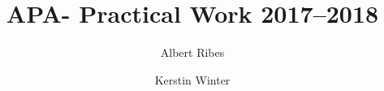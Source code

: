 \usepackage[utf8]{inputenc}
\usepackage[english]{babel}
\usepackage{subfiles}
\usepackage{graphicx}
\usepackage{csquotes}
\usepackage{todonotes}
\usepackage{color}
\usepackage{amsmath}

\usepackage{biblatex}


\usepackage{hyperref}
\hypersetup{
    colorlinks,
    citecolor=black,
    filecolor=black,
    linkcolor=black,
    urlcolor=black
}
\graphicspath{{images/}{../images/}}

\newcommand{\addfile}[1]{}

\newcommand{\red}[1]{\textcolor{red}{#1}}
\newcommand{\blue}[1]{\textcolor{blue}{#1}}
\newcommand{\green}[1]{\textcolor{green}{#1}}


\iffalse

\begin{figure}[bh]
\centering
\texttt{[image: imageName]}
\label{fig:img1}
\caption{The caption of the image}
\end{figure}


\fi

\title{APA- Practical Work 2017--2018}
\author{
Albert Ribes
\and
Kerstin Winter
}


  \maketitle
  \tableofcontents
  \newpage




  \addfile{introduction}
  \addfile{related-previous-work}
  \addfile{data-exploration-process}
  \addfile{resampling-protocol}
  \addfile{evaluation-explanation}
  \addfile{results-linear}
  \addfile{results-non-linear}
  \addfile{model-chosen}
  \addfile{self-assessment}
  \addfile{conclusion}
  \addfile{extensions}

  \printbibliography


